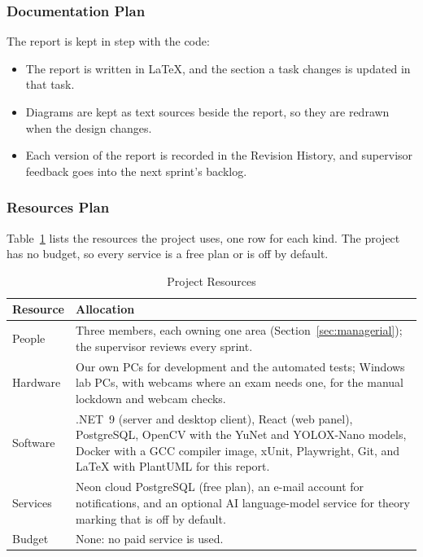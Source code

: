 \subsubsection{Documentation Plan}

The report is kept in step with the code:
\begin{itemize}[nosep]
    \item The report is written in LaTeX, and the section a task changes is updated in that task.
    \item Diagrams are kept as text sources beside the report, so they are redrawn when the design changes.
    \item Each version of the report is recorded in the Revision History, and supervisor feedback goes into the next sprint's backlog.
\end{itemize}

\subsubsection{Resources Plan}
\label{sec:resources_plan}

Table~\ref{tab:resources} lists the resources the project uses, one row for each kind. The project has no budget, so every service is a free plan or is off by default.

\begin{table}[!ht]
\centering
\caption{Project Resources}
\label{tab:resources}
{\small\renewcommand{\arraystretch}{1.2}
\begin{tabularx}{\textwidth}{>{\raggedright\arraybackslash}p{2.2cm}>{\raggedright\arraybackslash}X}
\hline\hline
\textbf{Resource} & \textbf{Allocation} \\
\hline
People & Three members, each owning one area (Section~\ref{sec:managerial}); the supervisor reviews every sprint. \\
Hardware & Our own PCs for development and the automated tests; Windows lab PCs, with webcams where an exam needs one, for the manual lockdown and webcam checks. \\
Software & .NET~9 (server and desktop client), React (web panel), PostgreSQL, OpenCV with the YuNet and YOLOX-Nano models, Docker with a GCC compiler image, xUnit, Playwright, Git, and LaTeX with PlantUML for this report. \\
Services & Neon cloud PostgreSQL (free plan), an e-mail account for notifications, and an optional AI language-model service for theory marking that is off by default. \\
Budget & None: no paid service is used. \\
\hline\hline
\end{tabularx}}
\end{table}

